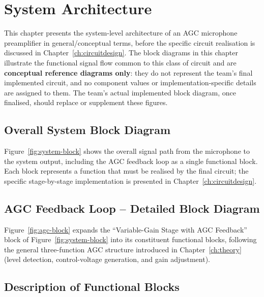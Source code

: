 \chapter{System Architecture}
\label{ch:architecture}

This chapter presents the system-level architecture of an AGC microphone preamplifier in general/conceptual terms, before the specific circuit realisation is discussed in Chapter~\ref{ch:circuitdesign}. The block diagrams in this chapter illustrate the functional signal flow common to this class of circuit and are \textbf{conceptual reference diagrams only}: they do not represent the team's final implemented circuit, and no component values or implementation-specific details are assigned to them. The team's actual implemented block diagram, once finalised, should replace or supplement these figures.

\section{Overall System Block Diagram}

Figure~\ref{fig:system-block} shows the overall signal path from the microphone to the system output, including the AGC feedback loop as a single functional block. Each block represents a function that must be realised by the final circuit; the specific stage-by-stage implementation is presented in Chapter~\ref{ch:circuitdesign}.



\section{AGC Feedback Loop -- Detailed Block Diagram}

Figure~\ref{fig:agc-block} expands the ``Variable-Gain Stage with AGC Feedback'' block of Figure~\ref{fig:system-block} into its constituent functional blocks, following the general three-function AGC structure introduced in Chapter~\ref{ch:theory} (level detection, control-voltage generation, and gain adjustment).



\section{Description of Functional Blocks}

